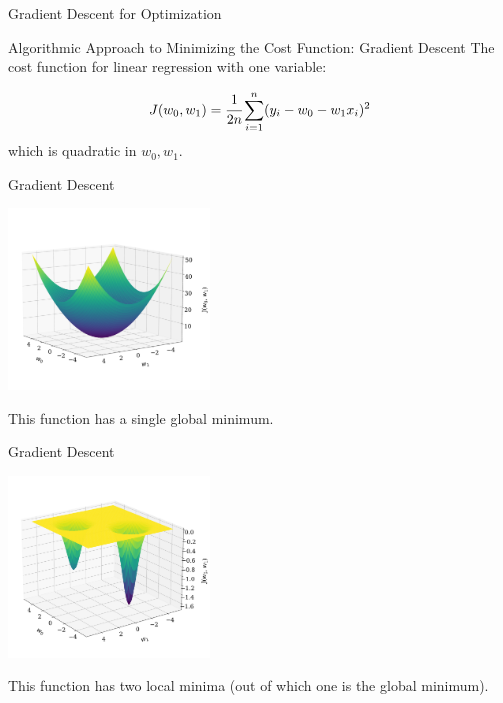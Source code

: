 \documentclass[aspectratio=169,xcolor=dvipsnames,svgnames,x11names,fleqn]{beamer}
\begin{document}
\begin{frame}{}

\end{frame}


\begin{frame}{}

\end{frame}


\begin{sectionframe}{}{Gradient Descent for Optimization}
\end{sectionframe}

\begin{frame}{Algorithmic Approach to Minimizing the Cost Function: Gradient Descent}
The cost function for linear regression with one variable:
\begin{talert}{}
\begin{equation}
    J(w_0, w_1) = \cfrac{1}{2n}\sum_{i=1}^n ( y_i -  w_0 - w_1 x_i )^2
\end{equation}
which is quadratic in $w_0, w_1$. 
\end{talert}

\end{frame}

\begin{frame}{Gradient Descent}
\begin{center}
        \includegraphics[width=0.40\textwidth]{figures/quadratic_surface.pdf}
        
        This function has a single global minimum.
\end{center}
\end{frame}

\begin{frame}{Gradient Descent}
\begin{center}
        \includegraphics[width=0.40\textwidth]{figures/quadratic_surface_2.pdf}
        
        This function has two local minima (out of which one is the global minimum).
\end{center}
\end{frame}
\end{document}
